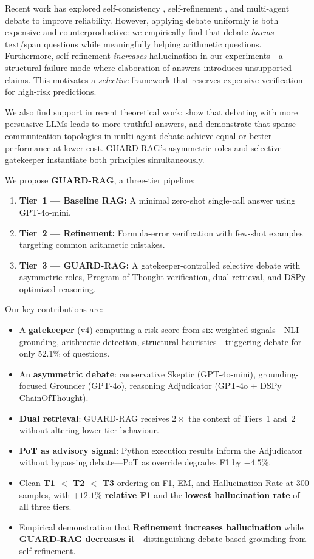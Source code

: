 \documentclass{article}
\begin{document}
Recent work has explored self-consistency \citep{wang2022selfconsistency}, self-refinement \citep{madaan2023selfrefine}, and multi-agent debate \citep{du2023debate, liang2023debate} to improve reliability. However, applying debate uniformly is both expensive and counterproductive: we empirically find that debate \emph{harms} text/span questions while meaningfully helping arithmetic questions. Furthermore, self-refinement \emph{increases} hallucination in our experiments---a structural failure mode where elaboration of answers introduces unsupported claims. This motivates a \emph{selective} framework that reserves expensive verification for high-risk predictions.

We also find support in recent theoretical work: \citet{kenton2024persuasive} show that debating with more persuasive LLMs leads to more truthful answers, and \citet{chen2024sparse} demonstrate that sparse communication topologies in multi-agent debate achieve equal or better performance at lower cost. GUARD-RAG's asymmetric roles and selective gatekeeper instantiate both principles simultaneously.

We propose \textbf{GUARD-RAG}, a three-tier pipeline:
\begin{enumerate}
  \item \textbf{Tier~1 --- Baseline RAG:} A minimal zero-shot single-call answer using GPT-4o-mini.
  \item \textbf{Tier~2 --- Refinement:} Formula-error verification with few-shot examples targeting common arithmetic mistakes.
  \item \textbf{Tier~3 --- GUARD-RAG:} A gatekeeper-controlled selective debate with asymmetric roles, Program-of-Thought verification, dual retrieval, and DSPy-optimized reasoning.
\end{enumerate}

Our key contributions are:
\begin{itemize}
  \item A \textbf{gatekeeper} (v4) computing a risk score from six weighted signals---NLI grounding, arithmetic detection, structural heuristics---triggering debate for only 52.1\% of questions.
  \item An \textbf{asymmetric debate}: conservative Skeptic (GPT-4o-mini), grounding-focused Grounder (GPT-4o), reasoning Adjudicator (GPT-4o + DSPy ChainOfThought).
  \item \textbf{Dual retrieval}: GUARD-RAG receives $2\times$ the context of Tiers~1 and~2 without altering lower-tier behaviour.
  \item \textbf{PoT as advisory signal}: Python execution results inform the Adjudicator without bypassing debate---PoT as override degrades F1 by $-4.5\%$.
  \item Clean \textbf{T1 $<$ T2 $<$ T3} ordering on F1, EM, and Hallucination Rate at 300 samples, with \textbf{$+12.1\%$ relative F1} and the \textbf{lowest hallucination rate} of all three tiers.
  \item Empirical demonstration that \textbf{Refinement increases hallucination} while \textbf{GUARD-RAG decreases it}---distinguishing debate-based grounding from self-refinement.
\end{itemize}
\end{document}

